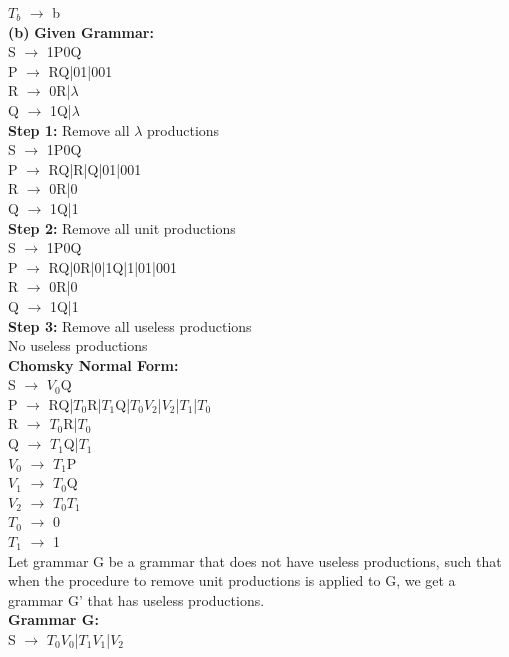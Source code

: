 \documentclass{homework}
\begin{document}
$T_b$ $\rightarrow$ b\\
\newline
\textbf{(b)}
\textbf{Given Grammar:}\\
S $\rightarrow$ 1P0Q\\ 
P $\rightarrow$ RQ|01|001\\
R $\rightarrow$ 0R|$\lambda$\\
Q $\rightarrow$ 1Q|$\lambda$\\
\newline
\textbf{Step 1:} Remove all $\lambda$ productions\\
S $\rightarrow$ 1P0Q\\ 
P $\rightarrow$ RQ|R|Q|01|001\\
R $\rightarrow$ 0R|0\\
Q $\rightarrow$ 1Q|1\\
\newline
\textbf{Step 2:} Remove all unit productions\\
S $\rightarrow$ 1P0Q\\ 
P $\rightarrow$ RQ|0R|0|1Q|1|01|001\\
R $\rightarrow$ 0R|0\\
Q $\rightarrow$ 1Q|1\\
\newline
\textbf{Step 3:} Remove all useless productions\\
No useless productions\\
\newline
\textbf{Chomsky Normal Form:}\\
S $\rightarrow$ $V_0$Q\\ 
P $\rightarrow$ RQ|$T_0$R|$T_1$Q|$T_0V_2$|$V_2$|$T_1$|$T_0$\\
R $\rightarrow$ $T_0$R|$T_0$\\
Q $\rightarrow$ $T_1$Q|$T_1$\\
$V_0$ $\rightarrow$ $T_1$P\\
$V_1$ $\rightarrow$ $T_0$Q\\
$V_2$ $\rightarrow$ $T_0T_1$\\
$T_0$ $\rightarrow$ 0\\
$T_1$ $\rightarrow$ 1\\
\question
Let grammar G be a grammar that does not have useless productions, such that when the procedure to remove unit productions is applied to G, we get a grammar G' that has useless productions.\\
\newline
\textbf{Grammar G:}\\
S $\rightarrow$ $T_0V_0$|$T_1V_1$|$V_2$\\
\end{document}
